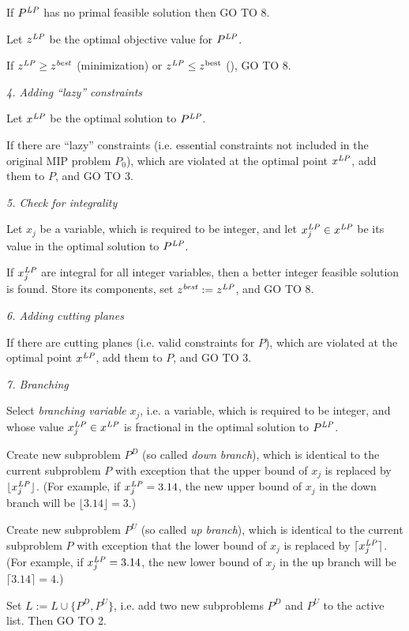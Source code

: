 If $P^{\it LP}$ has no primal feasible solution then GO TO 8.

Let $z^{\it LP}$ be the optimal objective value for $P^{\it LP}$.

If $z^{\it LP}\geq z^{\it best}$ (minimization) or
$z^{\it LP}\leq z^{\rm best}$ (), GO TO 8.

{\it 4. Adding ``lazy'' constraints}

Let $x^{\it LP}$ be the optimal solution to $P^{\it LP}$.

If there are ``lazy'' constraints (i.e. essential constraints not
included in the original MIP problem $P_0$), which are violated at the
optimal point $x^{\it LP}$, add them to $P$, and GO TO 3.

{\it 5. Check for integrality}

Let $x_j$ be a variable, which is required to be integer, and let
$x^{\it LP}_j\in x^{\it LP}$ be its value in the optimal solution to
$P^{\it LP}$.

If $x^{\it LP}_j$ are integral for all integer variables, then a better
integer feasible solution is found. Store its components, set
$z^{\it best}:=z^{\it LP}$, and GO TO 8.

{\it 6. Adding cutting planes}

If there are cutting planes (i.e. valid constraints for $P$),
which are violated at the optimal point $x^{\it LP}$, add them to $P$,
and GO TO 3.

{\it 7. Branching}

Select {\it branching variable} $x_j$, i.e. a variable, which is
required to be integer, and whose value $x^{\it LP}_j\in x^{\it LP}$ is
fractional in the optimal solution to $P^{\it LP}$.

Create new subproblem $P^D$ (so called {\it down branch}), which is
identical to the current subproblem $P$ with exception that the upper
bound of $x_j$ is replaced by $\lfloor x^{\it LP}_j\rfloor$. (For
example, if $x^{\it LP}_j=3.14$, the new upper bound of $x_j$ in the
down branch will be $\lfloor 3.14\rfloor=3$.)

Create new subproblem $P^U$ (so called {\it up branch}), which is
identical to the current subproblem $P$ with exception that the lower
bound of $x_j$ is replaced by $\lceil x^{\it LP}_j\rceil$. (For example,
if $x^{\it LP}_j=3.14$, the new lower bound of $x_j$ in the up branch
will be $\lceil 3.14\rceil=4$.)

Set $L:=L\cup\{P^D,P^U\}$, i.e. add two new subproblems $P^D$ and $P^U$
to the active list. Then GO TO 2.


